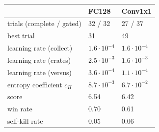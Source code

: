 \begin{tabular}{lll}
\hline
 & FC128 & Conv1x1 \\
\hline
trials (complete / gated) & 32 / 32 & 27 / 37 \\
best trial & 31 & 49 \\
learning rate (collect) & $1.6\cdot10^{-4}$ & $1.6\cdot10^{-4}$ \\
learning rate (crates) & $2.5\cdot10^{-3}$ & $1.6\cdot10^{-3}$ \\
learning rate (versus) & $3.6\cdot10^{-4}$ & $1.1\cdot10^{-4}$ \\
entropy coefficient $c_H$ & $8.7\cdot10^{-3}$ & $6.7\cdot10^{-2}$ \\
score & 6.54 & 6.42 \\
win rate & 0.70 & 0.61 \\
self-kill rate & 0.05 & 0.06 \\
\hline
\end{tabular}
